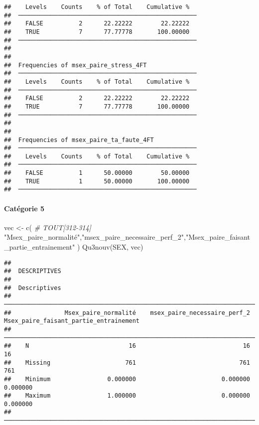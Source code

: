 \documentclass[
]{article}
\newenvironment{Shaded}{\begin{snugshade}}{\end{snugshade}}
\newcommand{\CommentTok}[1]{\textcolor[rgb]{0.56,0.35,0.01}{\textit{#1}}}
\newcommand{\FunctionTok}[1]{\textcolor[rgb]{0.00,0.00,0.00}{#1}}
\newcommand{\NormalTok}[1]{#1}
\newcommand{\OtherTok}[1]{\textcolor[rgb]{0.56,0.35,0.01}{#1}}
\newcommand{\StringTok}[1]{\textcolor[rgb]{0.31,0.60,0.02}{#1}}
\begin{document}
\begin{verbatim}
##    Levels    Counts    % of Total    Cumulative %   
##  ────────────────────────────────────────────────── 
##    FALSE          2      22.22222        22.22222   
##    TRUE           7      77.77778       100.00000   
##  ────────────────────────────────────────────────── 
## 
## 
##  Frequencies of msex_paire_stress_4FT               
##  ────────────────────────────────────────────────── 
##    Levels    Counts    % of Total    Cumulative %   
##  ────────────────────────────────────────────────── 
##    FALSE          2      22.22222        22.22222   
##    TRUE           7      77.77778       100.00000   
##  ────────────────────────────────────────────────── 
## 
## 
##  Frequencies of msex_paire_ta_faute_4FT             
##  ────────────────────────────────────────────────── 
##    Levels    Counts    % of Total    Cumulative %   
##  ────────────────────────────────────────────────── 
##    FALSE          1      50.00000        50.00000   
##    TRUE           1      50.00000       100.00000   
##  ──────────────────────────────────────────────────
\end{verbatim}

\hypertarget{catuxe9gorie-5}{%
\paragraph{Catégorie 5}\label{catuxe9gorie-5}}

\begin{Shaded}
\begin{Highlighting}[]
\NormalTok{vec }\OtherTok{\textless{}{-}} \FunctionTok{c}\NormalTok{(  }\CommentTok{\# TOUT[312{-}314]}
  \StringTok{"Msex\_paire\_normalité"}\NormalTok{,}\StringTok{"msex\_paire\_necessaire\_perf\_2"}\NormalTok{,}\StringTok{"Msex\_paire\_faisant\_partie\_entrainement"}
\NormalTok{)}
\FunctionTok{Qu3nouv}\NormalTok{(SEX, vec)}
\end{Highlighting}
\end{Shaded}

\begin{verbatim}
## 
##  DESCRIPTIVES
## 
##  Descriptives                                                                                                  
##  ───────────────────────────────────────────────────────────────────────────────────────────────────────────── 
##               Msex_paire_normalité    msex_paire_necessaire_perf_2    Msex_paire_faisant_partie_entrainement   
##  ───────────────────────────────────────────────────────────────────────────────────────────────────────────── 
##    N                            16                              16                                        16   
##    Missing                     761                             761                                       761   
##    Minimum                0.000000                        0.000000                                  0.000000   
##    Maximum                1.000000                        0.000000                                  0.000000   
##  ─────────────────────────────────────────────────────────────────────────────────────────────────────────────
\end{verbatim}
\end{document}
